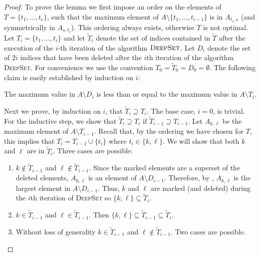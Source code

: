 \documentclass[lotsofwhite]{patmorin}
\begin{document}
\begin{proof}
To prove the lemma we first impose an order on the elements of
$T=\{t_1,\ldots,t_c\}$, such that the maximum element of $A \setminus
\{t_1,\ldots,t_{i-1}\}$ is in $A_{t_{i},\star}$ (and symmetrically in
$A_{\star,t_{i}}$).  This ordering always exists, otherwise
$T$ is not optimal.  Let $T_i = \{t_1,\ldots,t_i\}$ and let
$\tilde{T}_i$ denote the set of indices contained in $\tilde{T}$ after
the execution of the $i$-th iteration of the algorithm
$\textsc{DeepSet}$.  Let $D_i$ denote the set of $2i$ indices that
have been deleted after the $i$th iteration of the algorithm
\textsc{DeepSet}.  For convenience we use the convention
$T_0=\tilde{T}_0=D_0=\emptyset$.  The following claim is easily
established by induction on $i$:

\begin{clm}
The maximum value in $A\setminus D_i$ is less than or equal to the
maximum value in $A\setminus T_i$.
\end{clm}

Next we prove, by induction on $i$, that $\tilde{T}_{i}\supseteq T_i$.
The base case, $i=0$, is trivial.  For the inductive step, we show
that $\tilde{T}_i \supseteq T_i$ if $\tilde{T}_{i-1} \supseteq
T_{i-1}$.  Let $A_{k,\ell}$ be the maximum element of $A \setminus
T_{i-1}$.  Recall that, by the ordering we have chosen for $T$, this
implies that $T_i=T_{i-1}\cup\{t_i\}$ where $t_i\in\{k,\ell\}$.  We
will show that both $k$ and $\ell$ are in $\tilde{T}_i$. Three cases
are possible: 

\begin{enumerate}

\item $k \not \in \tilde{T}_{i-1}$ and $\ell \not \in
\tilde{T}_{i-1}$.  Since the marked elements are a superset of the
deleted elements, $A_{k,\ell}$ is an element of $A \setminus D_{i-1}$.
Therefore, by , $A_{k,\ell}$ is the largest
element in $A\setminus D_{i-1}$.  Thus, $k$ and $\ell$ are marked (and
deleted) during the $i$th iteration of \textsc{DeepSet} so
$\{k,\ell\}\subseteq\tilde{T}_i$. 

\item $k \in \tilde{T}_{i-1}$ and $\ell \in \tilde{T}_{i-1}$.  Then
$\{k,\ell\}\subseteq \tilde{T}_{i-1}\subseteq \tilde{T}_i$.

\item Without loss of generality $k \in \tilde{T}_{i-1}$ and $\ell \not
\in \tilde{T}_{i-1}$. Two cases are possible.


\end{enumerate}
\end{proof}
\end{document}
